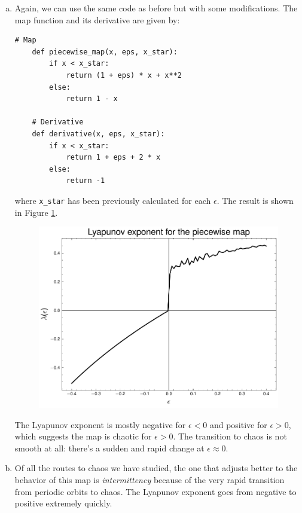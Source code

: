 \begin{enumerate}[(a)]
    \item Again, we can use the same code as before but with some modifications.
    The map function and its derivative are given by:
    \begin{lstlisting}[style=pythonstyle]
    # Map
    def piecewise_map(x, eps, x_star):
        if x < x_star:
            return (1 + eps) * x + x**2
        else:
            return 1 - x
        
    # Derivative
    def derivative(x, eps, x_star):
        if x < x_star:
            return 1 + eps + 2 * x
        else:
            return -1
    \end{lstlisting}

    where \texttt{x\_star} has been previously calculated for each $\epsilon$.
    The result is shown in Figure \ref{fig:2a}.
    \begin{figure}[!ht]
        \centering
        \includegraphics[scale=0.65]{images/piecewise_lya.pdf}
        \label{fig:2a}
    \end{figure}
    The Lyapunov exponent is mostly negative for $\epsilon < 0$ and positive for $\epsilon > 0$, which
    suggests the map is chaotic for $\epsilon > 0$. The transition to chaos is not smooth at all: there's a 
    sudden and rapid change at $\epsilon \approx 0$.
    \item Of all the routes to chaos we have studied, the one that adjusts better to the behavior of this map is
    \textit{intermittency} because of the very rapid transition from periodic orbits to chaos. The Lyapunov exponent goes from negative
    to positive extremely quickly.
\end{enumerate}

